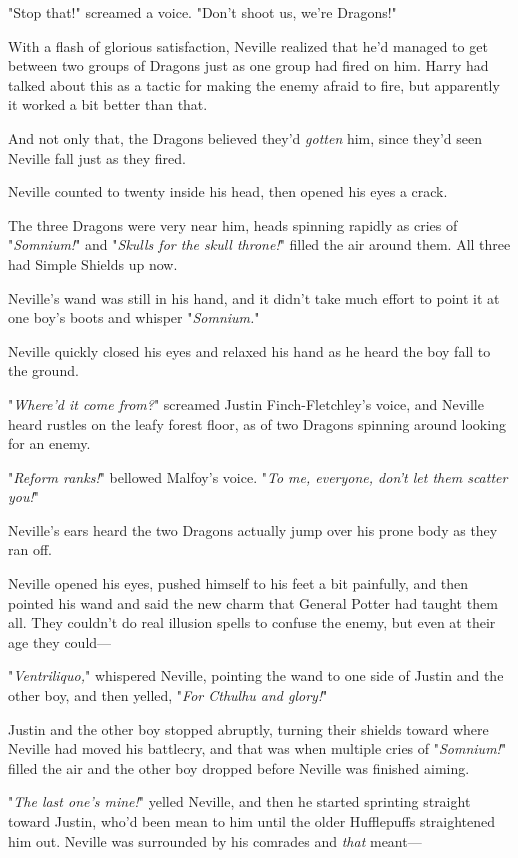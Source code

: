 "Stop that!" screamed a voice. "Don't shoot us, we're Dragons!"

With a flash of glorious satisfaction, Neville realized that he'd managed to
get between two groups of Dragons just as one group had fired on him. Harry had
talked about this as a tactic for making the enemy afraid to fire, but
apparently it worked a bit better than that.

And not only that, the Dragons believed they'd \emph{gotten} him, since they'd
seen Neville fall just as they fired.

Neville counted to twenty inside his head, then opened his eyes a crack.

The three Dragons were very near him, heads spinning rapidly as cries of
"\emph{Somnium!}" and "\emph{Skulls for the skull throne!}" filled the air
around them. All three had Simple Shields up now.

Neville's wand was still in his hand, and it didn't take much effort to point
it at one boy's boots and whisper "\emph{Somnium.}"

Neville quickly closed his eyes and relaxed his hand as he heard the boy fall
to the ground.

"\emph{Where'd it come from?}" screamed Justin Finch-Fletchley's voice, and
Neville heard rustles on the leafy forest floor, as of two Dragons spinning
around looking for an enemy.

"\emph{Reform ranks!}" bellowed Malfoy's voice. "\emph{To me, everyone, don't
let them scatter you!}"

Neville's ears heard the two Dragons actually jump over his prone body as they
ran off.

Neville opened his eyes, pushed himself to his feet a bit painfully, and then
pointed his wand and said the new charm that General Potter had taught them
all. They couldn't do real illusion spells to confuse the enemy, but even at
their age they could\mbox{---}

"\emph{Ventriliquo,}" whispered Neville, pointing the wand to one side of
Justin and the other boy, and then yelled, "\emph{For Cthulhu and glory!}"

Justin and the other boy stopped abruptly, turning their shields toward where
Neville had moved his battlecry, and that was when multiple cries of
"\emph{Somnium!}" filled the air and the other boy dropped before Neville was
finished aiming.

"\emph{The last one's mine!}" yelled Neville, and then he started sprinting
straight toward Justin, who'd been mean to him until the older Hufflepuffs
straightened him out. Neville was surrounded by his comrades and \emph{that}
meant\mbox{---}

